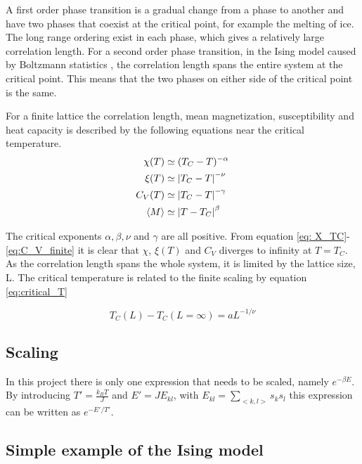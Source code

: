 A first order phase transition is a gradual change from a phase to another and have two phases that coexist at the critical point, for example the melting of ice. The long range ordering exist in each phase, which gives a relatively large correlation length. For a second order phase transition, in the Ising model caused by  Boltzmann statistics , the correlation length spans the entire system at the critical point. This means that the two phases on either side of the critical point is the same. 

For a finite lattice the correlation length, mean magnetization,  susceptibility and heat capacity  is described by the following equations  near the critical temperature. 
\begin{align}
	\chi(T) &\simeq (T_C-T)^{-\alpha}\label{eq: X_TC}\\
		\xi (T) &\simeq \abs{T_C-T}^{-\nu} \\
	C_V(T) &\simeq \abs{T_C-T}^{-\gamma} \label{eq:C_V_finite}\\
		\langle M\rangle &\simeq \abs{T-T_C}^{\beta}\\
 \end{align}

The critical exponents $ \alpha, \beta, \nu $ and $ \gamma $ are all positive. From equation \ref{eq: X_TC}-\ref{eq:C_V_finite} it is clear that $\chi$,  $\xi (T)$ and $ C_V $  diverges to infinity at $ T = T_C $. As the correlation length spans the whole system, it is limited by the lattice size, L. The critical temperature is related to the finite scaling by equation \ref{eq:critical_T}

\begin{equation}\label{eq:critical_T}
	T_C(L) - T_C(L=\infty) = a L^{-1/\nu}
\end{equation}


\subsection{Scaling}

In this project there is only one expression that needs to be scaled, namely $ e^{-\beta E} $. By introducing $ T' = \frac{k_B T	}{J} $ and $ E' = JE_{kl} $, with $ E_{kl} = \sum\limits_{<k,l>} s_ks_l $ this expression can be written as $ e^{-E'/T'} $.

\subsection{Simple example of the Ising model \label{sec_L2}}

